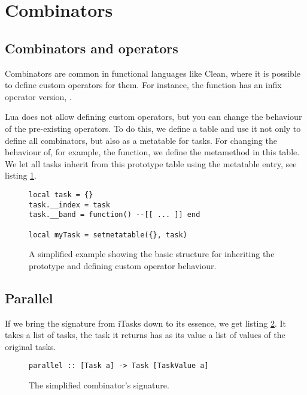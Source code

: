 \section{Combinators}\label{section-combinators}

\subsection{Combinators and operators}
Combinators are common in functional languages like Clean, where it is possible to define custom operators for them. For instance, the  function has an infix operator version, \clean{>>*}.

Lua does not allow defining custom operators, but you can change the behaviour of the pre-existing operators. To do this, we define a  table and use it not only to define all combinators, but also as a metatable for tasks. For changing the behaviour of, for example, the \lua{&} function, we define the  metamethod in this table. We let all tasks inherit from this prototype table using the  metatable entry, see listing \ref{lst:lua_task_metatable}.

\begin{figure}[ht]
\centering
\begin{verbatim}
local task = {}
task.__index = task
task.__band = function() --[[ ... ]] end

local myTask = setmetatable({}, task)
\end{verbatim}
\caption{A simplified example showing the basic structure for inheriting the prototype and defining custom operator behaviour.}
\label{lst:lua_task_metatable}
\end{figure}


\subsection{Parallel}
If we bring the  signature from iTasks down to its essence, we get listing \ref{lst:clean_parallel}. It takes a list of tasks, the task it returns has as its value a list of values of the original tasks.

\begin{figure}[ht]
\centering
\begin{verbatim}
parallel :: [Task a] -> Task [TaskValue a]
\end{verbatim}
\caption{The simplified  combinator's signature.}
\label{lst:clean_parallel}
\end{figure}

